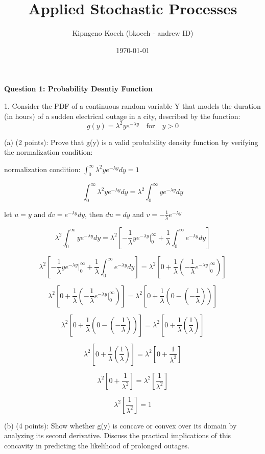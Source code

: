 \documentclass{article}
\title{Applied Stochastic Processes}
\author{Kipngeno Koech (bkoech - andrew ID)}
\date{\today}
\begin{document}
\maketitle
\begin{center}
    \large \textbf{Question 1: Probability Desntiy Function}
\end{center}

1. Consider the PDF of a continuous random variable Y that models the duration (in hours) of a
sudden electrical outage in a city, described by the function:
\[g(y) = \lambda^2ye^{-\lambda y} \quad \text{for} \quad y > 0\]

(a) (2 points): Prove that g(y) is a valid probability density function by verifying the normalization
condition:\newline

normalization condition: \(\int_{0}^{\infty}\lambda^2ye^{-\lambda y}dy = 1\)

\[\int_{0}^{\infty}\lambda^2ye^{-\lambda y}dy = \lambda^2\int_{0}^{\infty}ye^{-\lambda y}dy\]

let \(u = y\) and \(dv = e^{-\lambda y}dy\), then \(du = dy\) and \(v = -\frac{1}{\lambda}e^{-\lambda y}\)

\[\lambda^2\int_{0}^{\infty}ye^{-\lambda y}dy = \lambda^2\left[-\frac{1}{\lambda}ye^{-\lambda y}\Big|_{0}^{\infty} + \frac{1}{\lambda}\int_{0}^{\infty}e^{-\lambda y}dy\right]\]

\[\lambda^2\left[-\frac{1}{\lambda}ye^{-\lambda y}\Big|_{0}^{\infty} + \frac{1}{\lambda}\int_{0}^{\infty}e^{-\lambda y}dy\right] = \lambda^2\left[0 + \frac{1}{\lambda}\left(-\frac{1}{\lambda}e^{-\lambda y}\Big|_{0}^{\infty}\right)\right]\]

\[\lambda^2\left[0 + \frac{1}{\lambda}\left(-\frac{1}{\lambda}e^{-\lambda y}\Big|_{0}^{\infty}\right)\right] = \lambda^2\left[0 + \frac{1}{\lambda}\left(0 - (-\frac{1}{\lambda})\right)\right]\]

\[\lambda^2\left[0 + \frac{1}{\lambda}\left(0 - (-\frac{1}{\lambda})\right)\right] = \lambda^2\left[0 + \frac{1}{\lambda}\left(\frac{1}{\lambda}\right)\right]\]

\[\lambda^2\left[0 + \frac{1}{\lambda}\left(\frac{1}{\lambda}\right)\right] = \lambda^2\left[0 + \frac{1}{\lambda^2}\right]\]

\[\lambda^2\left[0 + \frac{1}{\lambda^2}\right] = \lambda^2\left[\frac{1}{\lambda^2}\right]\]

\[\lambda^2\left[\frac{1}{\lambda^2}\right] = 1\]

(b) (4 points): Show whether g(y) is concave or convex over its domain by analyzing its second
derivative. Discuss the practical implications of this concavity in predicting the likelihood of
prolonged outages.
\end{document}
